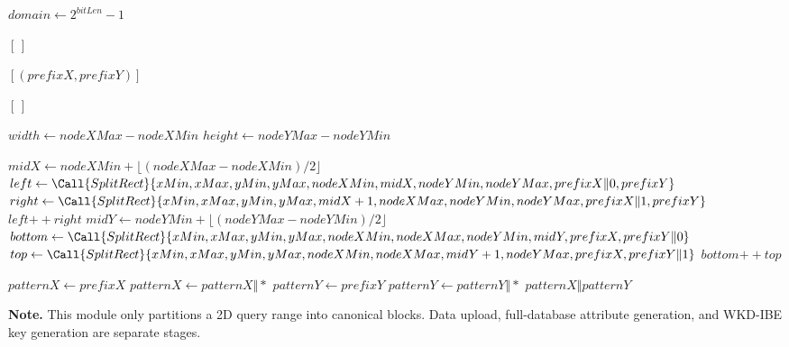 
\begin{algorithm}[t]
\caption{2D query partition module}
\begin{algorithmic}[1]
    \State $domain \gets 2^{bitLen} - 1$
    \State \Return {}
\EndProcedure

        \State \Return $[\,]$
    \EndIf

        \State \Return $[(prefixX, prefixY)]$
    \EndIf

        \State \Return $[\,]$
    \EndIf

    \State $width \gets nodeXMax - nodeXMin$
    \State $height \gets nodeYMax - nodeYMin$

        \State $midX \gets nodeXMin + \lfloor (nodeXMax - nodeXMin)/2 \rfloor$
        \State $left \gets \Call{SplitRect}{xMin, xMax, yMin, yMax, nodeXMin, midX, nodeYMin, nodeYMax, prefixX \Vert 0, prefixY}$
        \State $right \gets \Call{SplitRect}{xMin, xMax, yMin, yMax, midX + 1, nodeXMax, nodeYMin, nodeYMax, prefixX \Vert 1, prefixY}$
        \State \Return $left \mathbin{+\!\!+} right$
    \Else
        \State $midY \gets nodeYMin + \lfloor (nodeYMax - nodeYMin)/2 \rfloor$
        \State $bottom \gets \Call{SplitRect}{xMin, xMax, yMin, yMax, nodeXMin, nodeXMax, nodeYMin, midY, prefixX, prefixY \Vert 0}$
        \State $top \gets \Call{SplitRect}{xMin, xMax, yMin, yMax, nodeXMin, nodeXMax, midY + 1, nodeYMax, prefixX, prefixY \Vert 1}$
        \State \Return $bottom \mathbin{+\!\!+} top$
    \EndIf
\EndProcedure

    \State $patternX \gets prefixX$
        \State $patternX \gets patternX \Vert \ast$
    \EndFor
    \State $patternY \gets prefixY$
        \State $patternY \gets patternY \Vert \ast$
    \EndFor
    \State \Return $patternX \Vert patternY$
\EndProcedure
\end{algorithmic}
\end{algorithm}

\noindent\textbf{Note.}
This module only partitions a 2D query range into canonical blocks.
Data upload, full-database attribute generation, and WKD-IBE key generation are separate stages.
